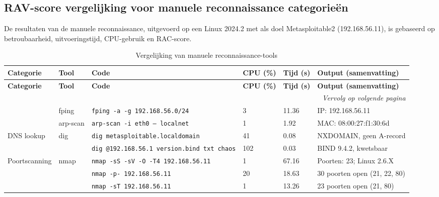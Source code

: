 \chapter{}%
\label{app:manueel}

\section{RAV-score vergelijking voor manuele reconnaissance categorieën}
De resultaten van de manuele reconnaissance, uitgevoerd op een Linux 2024.2 met als doel Metasploitable2 (192.168.56.11), is gebaseerd op betroubaarheid, uitvoeringstijd, CPU-gebruik en RAC-score.

{\small
\begin{landscape}
\selectfont
\setlength{\tabcolsep}{1.5pt}
\begin{longtable}{lllp{2cm}p{1.2cm}p{4cm}}
\caption{Vergelijking van manuele reconnaissance-tools} \label{tab:vergelijking-recon-manueel} \\
\toprule
\textbf{Categorie} & \textbf{Tool} & \textbf{Code} & \textbf{CPU (\%)} & \textbf{Tijd (s)} & \textbf{Output (samenvatting)} \\
\midrule
\endfirsthead
\toprule
\textbf{Categorie} & \textbf{Tool} & \textbf{Code} & \textbf{CPU (\%)} & \textbf{Tijd (s)} & \textbf{Output (samenvatting)} \\
\midrule
\endhead
\midrule
\multicolumn{6}{r}{\textit{Vervolg op volgende pagina}} \\
\endfoot
\bottomrule
\endlastfoot
\multirow{2}{*}{Host discovery} & fping & \texttt{fping -a -g 192.168.56.0/24} & 3 & 11.36 & IP: 192.168.56.11 \\
 & arp-scan & \texttt{arp-scan -i eth0 -- localnet} & 1 & 1.92 & MAC: 08:00:27:f1:30:6d \\
\multirow{2}{*}{DNS lookup} & \multirow{2}{*}{dig} & \texttt{dig metasploitable.localdomain} & 41 & 0.08 & NXDOMAIN, geen A-record \\
 & & \texttt{dig @192.168.56.1 version.bind txt chaos} & 102 & 0.03 & BIND 9.4.2, kwetsbaar \\
\multirow{4}{*}{Poortscanning} & \multirow{3}{*}{nmap} & \texttt{nmap -sS -sV -O -T4 192.168.56.11} & 1 & 67.16 & Poorten: 23; Linux 2.6.X \\
 & & \texttt{nmap -p- 192.168.56.11} & 20 & 18.63 & 30 poorten open (21, 22, 80) \\
 & & \texttt{nmap -sT 192.168.56.11} & 1 & 13.26 & 23 poorten open (21, 80) \\

\end{longtable}
\end{landscape}}
